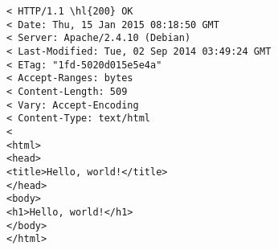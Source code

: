 \documentclass[varwidth=24.2em,crop]{standalone}
\begin{document}
\begin{Verbatim}[commandchars=\\\{\}]
< HTTP/1.1 \hl{200} OK
< Date: Thu, 15 Jan 2015 08:18:50 GMT
< Server: Apache/2.4.10 (Debian)
< Last-Modified: Tue, 02 Sep 2014 03:49:24 GMT
< ETag: "1fd-5020d015e5e4a"
< Accept-Ranges: bytes
< Content-Length: 509
< Vary: Accept-Encoding
< Content-Type: text/html
< 
<html>
<head>
<title>Hello, world!</title>
</head>
<body>
<h1>Hello, world!</h1>
</body>
</html>
\end{Verbatim}
\end{document}
